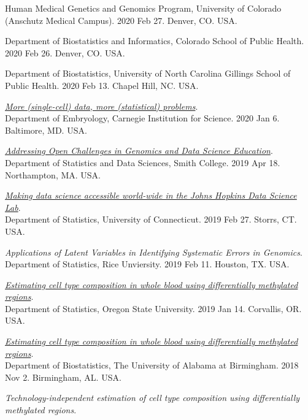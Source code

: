 \documentclass[10pt]{article}
\begin{document}
\item 
Human Medical Genetics and Genomics Program, University of Colorado (Anschutz Medical Campus). 2020 Feb 27. Denver, CO. USA.
\item 
Department of Biostatistics and Informatics, Colorado School of Public Health. 2020 Feb 26. Denver, CO. USA.
\item 
Department of Biostatistics, University of North Carolina Gillings School of Public Health. 2020 Feb 13. Chapel Hill, NC. USA. 
\item 
{\it \href{https://docs.google.com/presentation/d/1o5dCD3zYh6hOrbD6TxMeKVNV8oYw-SmH8MTKewGIhB4/edit?usp=sharing}{More (single-cell) data, more (statistical) problems}}. \\ 
Department of Embryology, Carnegie Institution for Science. 2020 Jan 6. Baltimore, MD. USA.
\item 
{\it \href{https://speakerdeck.com/stephaniehicks/addressing-open-challenges-in-data-science-education}{Addressing Open Challenges in Genomics and Data Science Education}}. \\ 
Department of Statistics and Data Sciences, Smith College. 2019 Apr 18. Northampton, MA. USA.
\item 
{\it \href{https://speakerdeck.com/stephaniehicks/making-data-science-accessible-in-the-johns-hopkins-data-science-lab}{Making data science accessible world-wide in the Johns Hopkins Data Science Lab}}. \\ 
Department of Statistics, University of Connecticut. 2019 Feb 27. Storrs, CT. USA.
\item 
{\it Applications of Latent Variables in Identifying Systematic Errors in Genomics}. \\
Department of Statistics, Rice Unviersity. 2019 Feb 11. Houston, TX. USA.
\item 
{\it \href{https://speakerdeck.com/stephaniehicks/methylcc-presentation}{Estimating cell type composition in whole blood using differentially methylated regions}}. \\
Department of Statistics, Oregon State University. 2019 Jan 14. Corvallis, OR. USA.
\item 
{\it \href{https://speakerdeck.com/stephaniehicks/methylcc-presentation}{Estimating cell type composition in whole blood using differentially methylated regions}}. \\
Department of Biostatistics, The University of Alabama at Birmingham. 2018 Nov 2. Birmingham, AL. USA.
\item 
{\it Technology-independent estimation of cell type composition using differentially methylated regions}. \\
\end{document}
